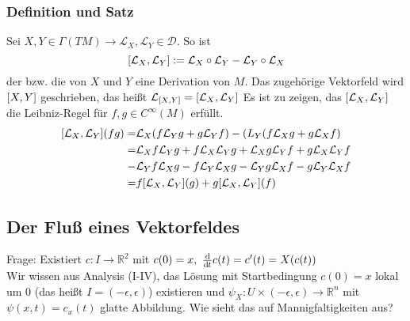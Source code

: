 \subsubsection{Definition und Satz}
\label{ssub:154}
Sei $X,Y \in \Gamma(TM) \to \mathcal{L}_X,\mathcal{L}_Y \in \mathcal{D}$. So ist 
\[
\benbrace*{\mathcal{L}_X,\mathcal{L}_Y}:= \mathcal{L}_X \circ \mathcal{L}_Y - \mathcal{L}_Y \circ \mathcal{L}_X 
\]
der  bzw. die  von $X$ und $Y$ eine Derivation von $M$. Das zugehörige Vektorfeld wird $\benbrace{X,Y}$ geschrieben, das heißt $\mathcal{L}_{\benbrace{X,Y}} = \benbrace*{\mathcal{L}_X,\mathcal{L}_Y}$
Es ist zu zeigen, das $\benbrace*{\mathcal{L}_X,\mathcal{L}_Y}$ die Leibniz-Regel für $f,g\in C^\infty (M)$ erfüllt.
\begin{align*}
\benbrace*{\mathcal{L}_X,\mathcal{L}_Y}(fg) 
=& \mathcal{L}_X \enbrace{f\mathcal{L}_Y g + g\mathcal{L}_Y f} - \mathcal({L}_Y \enbrace{f\mathcal{L}_X g + g\mathcal{L}_X f}\\ 
=& \mathcal{L}_X f \mathcal{L}_Y g + f \mathcal{L}_X \mathcal{L}_Y g + \mathcal{L}_X g \mathcal{L}_Y f + g \mathcal{L}_X \mathcal{L}_Y f \\
-& \mathcal{L}_Y f \mathcal{L}_X g - f \mathcal{L}_Y \mathcal{L}_X g - \mathcal{L}_Y g \mathcal{L}_X f - g \mathcal{L}_Y \mathcal{L}_X f\\
=& f\benbrace*{\mathcal{L}_X,\mathcal{L}_Y}(g) + g\benbrace*{\mathcal{L}_X,\mathcal{L}_Y}(f)
\end{align*}

\subsection{Der Fluß eines Vektorfeldes}
\label{sub:18}
\begin{wrapfigure}[8]{R}[1.5cm]{4cm}
\end{wrapfigure}
Frage: Existiert $c:I\to \mathds{R}^2$ mit $c(0) = x,\ \frac{\mathd}{\mathd t}c(t) = c'(t) = X(c(t))$\\
Wir wissen aus Analysis (I-IV), das Lösung mit Startbedingung $c(0) = x$ lokal um $0$ (das heißt $I = (-\epsilon,\epsilon)$) existieren und $\psi_X:U\times (-\epsilon,\epsilon) \to \mathds{R}^n$ mit $\psi(x,t) = c_x(t)$ glatte Abbildung. Wie sieht das auf Mannigfaltigkeiten aus?

